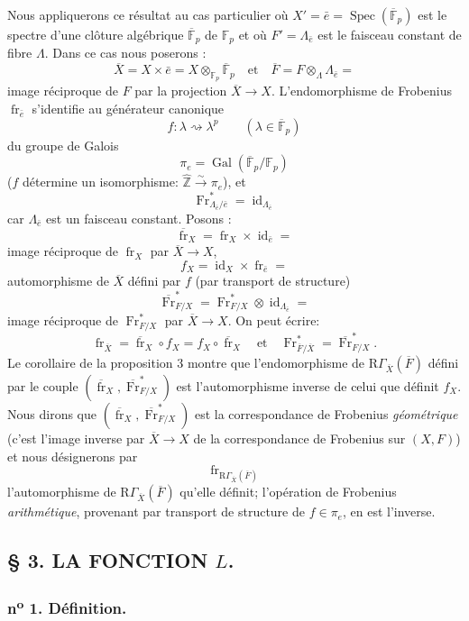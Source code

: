 \documentclass[11pt]{article}
\DeclareMathOperator{\Spec}{Spec}
\providecommand{\Gal}{\operatorname{Gal}}
\providecommand{\id}{\operatorname{id}}
\providecommand{\id}{\operatorname{id}}
\providecommand{\id}{\operatorname{id}}
\providecommand{\id}{\operatorname{id}}
\providecommand{\Spec}{\operatorname{Spec}}
\providecommand{\Spec}{\operatorname{Spec}}
\providecommand{\id}{\operatorname{id}}
\providecommand{\Spec}{\operatorname{Spec}}
\providecommand{\fr}{\operatorname{fr}}
\providecommand{\Fr}{\operatorname{Fr}}
\providecommand{\Fr}{\operatorname{Fr}}
\providecommand{\fr}{\operatorname{fr}}
\providecommand{\Spec}{\operatorname{Spec}}
\providecommand{\id}{\operatorname{id}}
\providecommand{\Gal}{\operatorname{Gal}}
\begin{document}
Nous appliquerons ce résultat au cas particulier où $X'=\bar e=\Spec(\overline{\mathbb F}_p)$ est le spectre d'une clôture algébrique $\overline{\mathbb F}_p$ de $\mathbb F_p$ et où $F'=\Lambda_{\bar e}$ est le faisceau constant de fibre $\Lambda$. Dans ce cas nous poserons :
\[
\overline X=X\times\bar e=X\otimes_{\mathbb F_p}\overline{\mathbb F}_p\quad\text{et}\quad
\overline F=F\otimes_\Lambda\Lambda_{\bar e}=
\]
image réciproque de $F$ par la projection $\overline X\to X$. L'endomorphisme de Frobenius $\fr_{\bar e}$ s'identifie au générateur canonique
\[
f:\lambda\rightsquigarrow\lambda^p\qquad(\lambda\in\overline{\mathbb F}_p)
\]
du groupe de Galois
\[
\pi_e=\Gal(\overline{\mathbb F}_p/\mathbb F_p)
\]
($f$ détermine un isomorphisme: $\widehat{\mathbb Z}\xrightarrow{\sim}\pi_e$), et
\[
\Fr^*_{\Lambda_{\bar e}/\bar e}=\id_{\Lambda_{\bar e}}
\]
car $\Lambda_{\bar e}$ est un faisceau constant. Posons :
\[
\overline{\fr}_X=\fr_X\times\id_{\bar e}=
\]
image réciproque de $\fr_X$ par $\overline X\to X$,
\[
f_X=\id_X\times\fr_{\bar e}=
\]
automorphisme de $\overline X$ défini par $f$ (par transport de structure)
\[
\overline{\Fr}^*_{F/X}=\Fr^*_{F/X}\otimes\id_{\Lambda_{\bar e}}=
\]
image réciproque de $\Fr^*_{F/X}$ par $\overline X\to X$. On peut écrire:
\[
\fr_{\overline X}=\overline{\fr}_X\circ f_X=f_X\circ\overline{\fr}_X\quad\text{et}\quad
\Fr^*_{\overline F/\overline X}=\overline{\Fr}^*_{F/X}.
\]
Le corollaire de la proposition 3 montre que l'endomorphisme de $\mathrm{R}\Gamma_{\overline X}(\overline F)$ défini par le couple $(\overline{\fr}_X,\overline{\Fr}^*_{F/X})$ est l'automorphisme inverse de celui que définit $f_X$. Nous dirons que $(\overline{\fr}_X,\overline{\Fr}^*_{F/X})$ est la correspondance de Frobenius \emph{géométrique} (c'est l'image inverse par $\overline X\to X$ de la correspondance de Frobenius sur $(X,F)$) et nous désignerons par
\[
\fr_{\mathrm{R}\Gamma_{\overline X}(\overline F)}
\]
l'automorphisme de $\mathrm{R}\Gamma_{\overline X}(\overline F)$ qu'elle définit; l'opération de Frobenius \emph{arithmétique}, provenant par transport de structure de $f\in\pi_e$, en est l'inverse.

\subsection*{§ 3. LA FONCTION $L$.}

\subsubsection*{n\textsuperscript{o} 1. Définition.}
\end{document}
